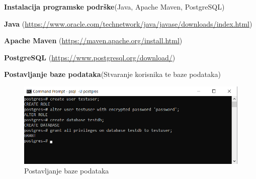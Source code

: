 			
			 
		   	\noindent {}
		   	\begin{packed_enum}
				
					\item \textbf{Instalacija programske podrške}(Java, Apache Maven, PostgreSQL)
    					\begin{packed_item}
                			\item \textbf{Java} (\url{https://www.oracle.com/technetwork/java/javase/downloads/index.html})
                			\item \textbf{Apache Maven} (\url{https://maven.apache.org/install.html})
                			\item \textbf{PostgreSQL} (\url{https://www.postgresql.org/download/})
    		      \end{packed_item}
					\item \textbf{Postavljanje baze podataka}(Stvaranje korisnika te baze podataka)
					
    					\begin{figure}[H]
    					\includegraphics[scale=1]{slike/backend/psqlsetup.png}
    					\centering
    					\caption{Postavljanje baze podataka}
    					\label{fig:PSQL-setup}
    		            \end{figure}
    		            

\end{packed_enum}
